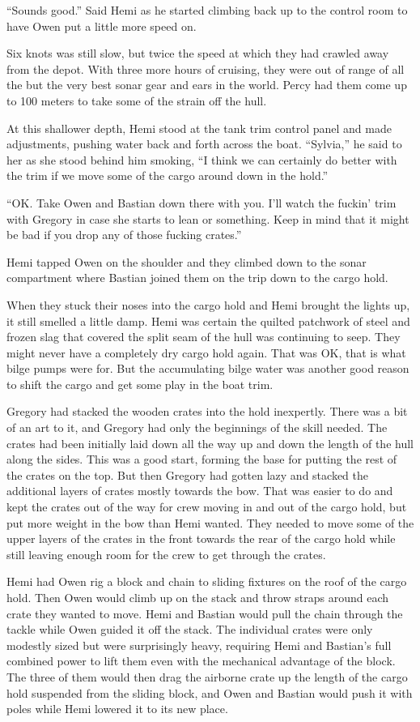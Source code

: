 \documentclass[
]{scrbook}
\begin{document}
``Sounds good.'' Said Hemi as he started climbing back up to the control
room to have Owen put a little more speed on.

Six knots was still slow, but twice the speed at which they had crawled
away from the depot. With three more hours of cruising, they were out of
range of all the but the very best sonar gear and ears in the world.
Percy had them come up to 100 meters to take some of the strain off the
hull.

At this shallower depth, Hemi stood at the tank trim control panel and
made adjustments, pushing water back and forth across the boat.
``Sylvia,'' he said to her as she stood behind him smoking, ``I think we
can certainly do better with the trim if we move some of the cargo
around down in the hold.''

``OK. Take Owen and Bastian down there with you. I'll watch the fuckin'
trim with Gregory in case she starts to lean or something. Keep in mind
that it might be bad if you drop any of those fucking crates.''

Hemi tapped Owen on the shoulder and they climbed down to the sonar
compartment where Bastian joined them on the trip down to the cargo
hold.

When they stuck their noses into the cargo hold and Hemi brought the
lights up, it still smelled a little damp. Hemi was certain the quilted
patchwork of steel and frozen slag that covered the split seam of the
hull was continuing to seep. They might never have a completely dry
cargo hold again. That was OK, that is what bilge pumps were for. But
the accumulating bilge water was another good reason to shift the cargo
and get some play in the boat trim.

Gregory had stacked the wooden crates into the hold inexpertly. There
was a bit of an art to it, and Gregory had only the beginnings of the
skill needed. The crates had been initially laid down all the way up and
down the length of the hull along the sides. This was a good start,
forming the base for putting the rest of the crates on the top. But then
Gregory had gotten lazy and stacked the additional layers of crates
mostly towards the bow. That was easier to do and kept the crates out of
the way for crew moving in and out of the cargo hold, but put more
weight in the bow than Hemi wanted. They needed to move some of the
upper layers of the crates in the front towards the rear of the cargo
hold while still leaving enough room for the crew to get through the
crates.

Hemi had Owen rig a block and chain to sliding fixtures on the roof of
the cargo hold. Then Owen would climb up on the stack and throw straps
around each crate they wanted to move. Hemi and Bastian would pull the
chain through the tackle while Owen guided it off the stack. The
individual crates were only modestly sized but were surprisingly heavy,
requiring Hemi and Bastian's full combined power to lift them even with
the mechanical advantage of the block. The three of them would then drag
the airborne crate up the length of the cargo hold suspended from the
sliding block, and Owen and Bastian would push it with poles while Hemi
lowered it to its new place.
\end{document}

